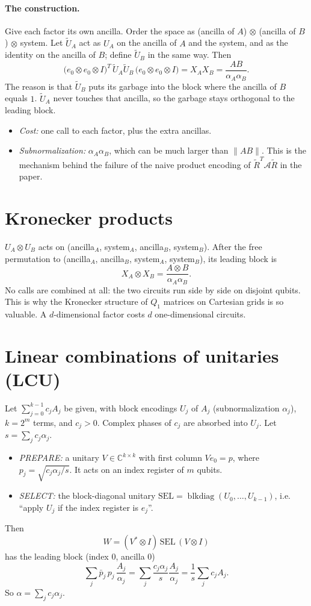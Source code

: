\documentclass[11pt,a4paper]{article}
\newcommand{\C}{\mathbb{C}}
\begin{document}
\paragraph{The construction.} Give each factor its own ancilla. Order the
space as (ancilla of $A$) $\otimes$ (ancilla of $B$) $\otimes$ system. Let $\widetilde U_A$
act as $U_A$ on the ancilla of $A$ and the system, and as the identity on the
ancilla of $B$; define $\widetilde U_B$ in the same way. Then
\[
\big(e_0\otimes e_0\otimes I\big)^T\,\widetilde U_A\widetilde U_B\,\big(e_0\otimes e_0\otimes I\big)=X_AX_B=\frac{AB}{\alpha_A\alpha_B}.
\]
The reason is that $\widetilde U_B$ puts its garbage into the block where the ancilla
of $B$ equals $1$. $\widetilde U_A$ never touches that ancilla, so the garbage
stays orthogonal to the leading block.
\begin{itemize}
\item \emph{Cost:} one call to each factor, plus the extra ancillas.
\item \emph{Subnormalization:} $\alpha_A\alpha_B$, which can be much larger than
  $\|AB\|$. This is the mechanism behind the failure of the naive product
  encoding of $\widetilde R^T\mathcal A\widetilde R$ in the paper.
\end{itemize}

\section{Kronecker products}

$U_A\otimes U_B$ acts on (ancilla$_A$, system$_A$, ancilla$_B$, system$_B$). After the
free permutation to (ancilla$_A$, ancilla$_B$, system$_A$, system$_B$), its leading
block is
\[
X_A\otimes X_B=\frac{A\otimes B}{\alpha_A\alpha_B}.
\]
No calls are combined at all: the two circuits run side by side on disjoint
qubits. This is why the Kronecker structure of $Q_1$ matrices on Cartesian
grids is so valuable. A $d$-dimensional factor costs $d$ one-dimensional
circuits.

\section{Linear combinations of unitaries (LCU)}

Let $\sum_{j=0}^{k-1}c_jA_j$ be given, with block encodings $U_j$ of $A_j$
(subnormalization $\alpha_j$), $k=2^m$ terms, and $c_j>0$. Complex phases of
$c_j$ are absorbed into $U_j$. Let $s=\sum_jc_j\alpha_j$.
\begin{itemize}
\item \emph{PREPARE:} a unitary $V\in\C^{k\times k}$ with first column
  $Ve_0=p$, where $p_j=\sqrt{c_j\alpha_j/s}$. It acts on an index register of
  $m$ qubits.
\item \emph{SELECT:} the block-diagonal unitary
  $\mathrm{SEL}=\operatorname{blkdiag}(U_0,\dots,U_{k-1})$, i.e. ``apply $U_j$ if the index
  register is $e_j$''.
\end{itemize}
Then
\[
W=(V^*\otimes I)\,\mathrm{SEL}\,(V\otimes I)
\]
has the leading block (index $0$, ancilla $0$)
\[
\sum_j\bar p_j\,p_j\,\frac{A_j}{\alpha_j}=\sum_j\frac{c_j\alpha_j}{s}\frac{A_j}{\alpha_j}=\frac1s\sum_jc_jA_j .
\]
So $\alpha=\sum_jc_j\alpha_j$.
\end{document}
